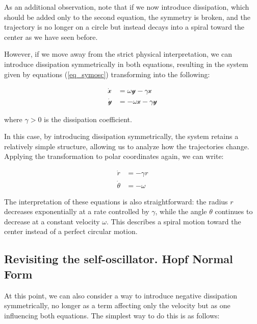 \documentclass{article}
\begin{document}
As an additional observation, note that if we now introduce dissipation, which should be added only to the second equation, the symmetry is broken, and the trajectory is no longer on a circle but instead decays into a spiral toward the center as we have seen before.

However, if we move away from the strict physical interpretation, we can introduce dissipation symmetrically in both equations, resulting in the system given by equations (\ref{eq_symosc}) transforming into the following:

\begin{subequations} \label{eq_symosc_diss}
\begin{align}
    \dot{\mathscr{x}} & = \omega\mathscr{y} - \gamma\mathscr{x} \\
    \dot{\mathscr{y}} & = -\omega\mathscr{x} - \gamma\mathscr{y}
\end{align}
\end{subequations}

where $\gamma > 0$ is the dissipation coefficient.

In this case, by introducing dissipation symmetrically, the system retains a relatively simple structure, allowing us to analyze how the trajectories change. Applying the transformation to polar coordinates again, we can write:

\begin{subequations} \label{eq_symosc_diss_polar}
\begin{align}
    \dot{r} & = -\gamma r \\
    \dot{\theta} & = -\omega 
\end{align}
\end{subequations}

The interpretation of these equations is also straightforward: the radius $r$ decreases exponentially at a rate controlled by $\gamma$, while the angle $\theta$ continues to decrease at a constant velocity $\omega$. This describes a spiral motion toward the center instead of a perfect circular motion.

\subsection{Revisiting the self-oscillator. Hopf Normal Form}

At this point, we can also consider a way to introduce negative dissipation symmetrically, no longer as a term affecting only the velocity but as one influencing both equations. 
The simplest way to do this is as follows:
\end{document}
